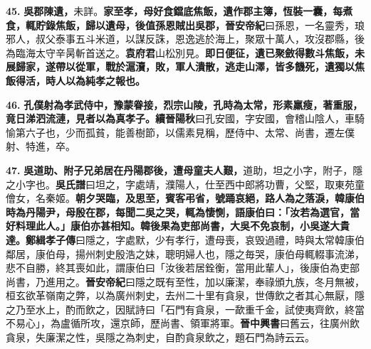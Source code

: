 \textbf{45.} \textbf{吳郡陳遺，}{\footnotesize 未詳。}\textbf{家至孝，母好食鐺底焦飯，遺作郡主簿，恆裝一囊，每煮食，輒貯錄焦飯，歸以遺母，後值孫恩賊出吳郡，}{\footnotesize \textbf{晉安帝紀}曰孫恩，一名靈秀，琅邪人，叔父泰事五斗米道，以謀反誅，恩逸逃於海上，聚眾十萬人，攻沒郡縣，後為臨海太守辛昺斬首送之。}\textbf{袁府君}{\footnotesize 山松別見。}\textbf{即日便征，遺已聚斂得數斗焦飯，未展歸家，遂帶以從軍，戰於滬瀆，敗，軍人潰散，逃走山澤，皆多饑死，遺獨以焦飯得活，時人以為純孝之報也。}

\textbf{46.} \textbf{孔僕射為孝武侍中，豫蒙眷接，烈宗山陵，孔時為太常，形素羸瘦，著重服，竟日涕泗流漣，見者以為真孝子。}{\footnotesize \textbf{續晉陽秋}曰孔安國，字安國，會稽山陰人，車騎愉第六子也，少而孤貧，能善樹節，以儒素見稱，歷侍中、太常、尚書，遷左僕射、特進，卒。}

\textbf{47.} \textbf{吳道助、附子兄弟居在丹陽郡後，遭母童夫人艱，}{\footnotesize 道助，坦之小字，附子，隱之小字也。\textbf{吳氏譜}曰坦之，字處靖，濮陽人，仕至西中郎將功曹，父堅，取東苑童儈女，名秦姬。}\textbf{朝夕哭臨，及思至，賓客弔省，號踊哀絕，路人為之落淚，韓康伯時為丹陽尹，母殷在郡，每聞二吳之哭，輒為悽惻，語康伯曰：「汝若為選官，當好料理此人。」康伯亦甚相知。韓後果為吏部尚書，大吳不免哀制，小吳遂大貴達。}{\footnotesize \textbf{鄭緝孝子傳}曰隱之，字處默，少有孝行，遭母喪，哀毁過禮，時與太常韓康伯鄰居，康伯母，揚州刺史殷浩之妹，聰明婦人也，隱之毎哭，康伯母輒輟事流涕，悲不自勝，終其喪如此，謂康伯曰「汝後若居銓衡，當用此輩人」，後康伯為吏部尚書，乃進用之。\textbf{晉安帝紀}曰隱之既有至性，加以廉潔，奉祿頒九族，冬月無被，桓玄欲革嶺南之弊，以為廣州刺史，去州二十里有貪泉，世傳飲之者其心無厭，隱之乃至水上，酌而飲之，因賦詩曰「石門有貪泉，一歃重千金，試使夷齊飲，終當不易心」，為盧循所攻，還京師，歷尚書、領軍將軍。\textbf{晉中興書}曰舊云，往廣州飲貪泉，失廉潔之性，吳隱之為刺史，自酌貪泉飲之，題石門為詩云云。}